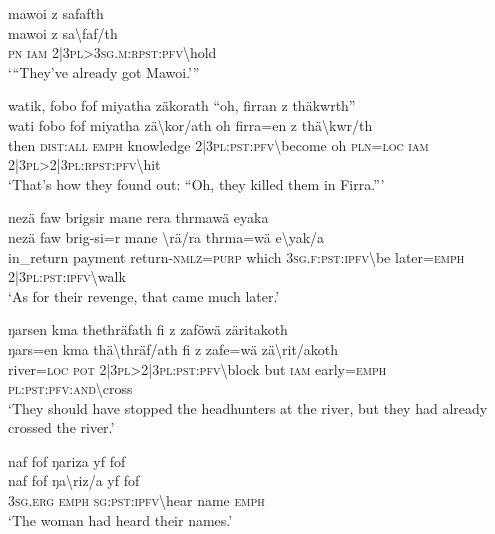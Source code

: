 \ea\label{ex:4:a1742}
mawoi z safafth\\
\gll mawoi	z	sa{\textbackslash}faf/th\\
     \textsc{pn}	\textsc{iam}	2|3\textsc{pl}>3\textsc{sg}.\textsc{m}:\textsc{rpst}:\textsc{pfv}{\textbackslash}hold\\
\glt `{``}They've already got Mawoi.'''
\z

\ea\label{ex:4:a1743}
watik, fobo fof miyatha zäkorath ``oh, firran z thäkwrth''\\
\gll wati	fobo	fof	miyatha	zä{\textbackslash}kor/ath	oh	firra=en	z	thä{\textbackslash}kwr/th\\
     then	\textsc{dist}:\textsc{all}	\textsc{emph}	knowledge	2|3\textsc{pl}:\textsc{pst}:\textsc{pfv}{\textbackslash}become	oh	\textsc{pln}=\textsc{loc}	\textsc{iam}	2|3\textsc{pl}>2|3\textsc{pl}:\textsc{rpst}:\textsc{pfv}{\textbackslash}hit\\
\glt `That's how they found out: ``Oh, they killed them in Firra.'''
\z

\ea\label{ex:4:a1744}
nezä faw brigsir mane rera  thrmawä eyaka\\
\gll nezä	faw	brig-si=r	mane	{\textbackslash}rä/ra	thrma=wä	e{\textbackslash}yak/a\\
     in\_return	payment	return-\textsc{nmlz}=\textsc{purp}	which	3\textsc{sg}.\textsc{f}:\textsc{pst}:\textsc{ipfv}{\textbackslash}be	later=\textsc{emph}	2|3\textsc{pl}:\textsc{pst}:\textsc{ipfv}{\textbackslash}walk\\
\glt `As for their revenge, that came much later.'
\z

\ea\label{ex:4:a1746}
ŋarsen kma thethräfath fi z zaföwä zäritakoth\\
\gll ŋars=en	kma	thä{\textbackslash}thräf/ath	fi	z	zafe=wä	zä{\textbackslash}rit/akoth\\
     river=\textsc{loc}	\textsc{pot}	2|3\textsc{pl}>2|3\textsc{pl}:\textsc{pst}:\textsc{pfv}{\textbackslash}block	but	\textsc{iam}	early=\textsc{emph}	\textsc{pl}:\textsc{pst}:\textsc{pfv}:\textsc{and}{\textbackslash}cross\\
\glt `They should have stopped the headhunters at the river, but they had already crossed the river.'
\z

\ea\label{ex:4:a1747}
naf fof ŋariza yf fof\\
\gll naf	fof	ŋa{\textbackslash}riz/a	yf	fof\\
     3\textsc{sg}.\textsc{erg}	\textsc{emph}	\textsc{sg}:\textsc{pst}:\textsc{ipfv}{\textbackslash}hear	name	\textsc{emph}\\
\glt `The woman had heard their names.'
\z

